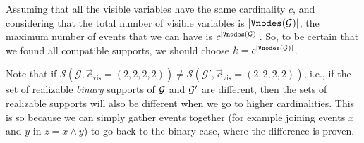 Assuming that all the visible variables have the same cardinality $c$, and considering that the total number of visible variables is  $|\mathtt{Vnodes}(\mathcal{G})|$, the maximum number of events that we can have is $c^{|\mathtt{Vnodes}(\mathcal{G})|}$. So, to be certain that we found all compatible supports, we should choose $k=c^{|\mathtt{Vnodes}(\mathcal{G})|}$. 

Note that if $\mathcal{S}(\mathcal{G},\vec c_\text{vis}=(2,2,2,2))\neq\mathcal{S}(\mathcal{G}',\vec c_\text{vis}=(2,2,2,2))$, i.e., if the set of realizable {\em binary} supports of $\cal G$ and $\cal G'$ are different, then the sets of realizable supports will also be different when we go to higher cardinalities. This is so because we can simply gather events together (for example joining events $x$ and $y$ in $z=x\land y$) to go back to the binary case, where the difference is proven. 